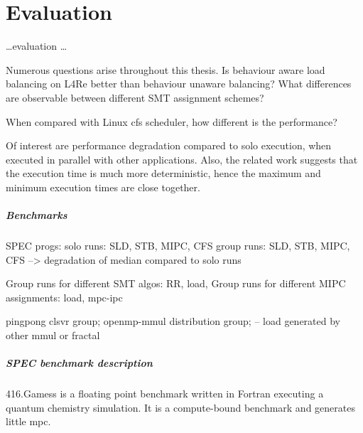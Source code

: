 \chapter{Evaluation}
\label{sec:evaluation}


\ldots evaluation \ldots

Numerous questions arise throughout this thesis.
Is behaviour aware load balancing on L4Re better than behaviour unaware
balancing?
What differences are observable between different SMT assignment schemes?

When compared with Linux \gls{cfs} scheduler, how different is the
performance?

Of interest are performance degradation compared to solo execution, when
executed in parallel with other applications.
Also, the related work suggests that the execution time is much more
deterministic, hence the maximum and minimum execution times are close
together.


\paragraph{Benchmarks}
SPEC progs:
solo runs: SLD, STB, MIPC, CFS
group runs: SLD, STB, MIPC, CFS
--> degradation of median compared  to solo runs

Group runs for different SMT algos: RR, load,
Group runs for different MIPC assignments: load, mpc-ipc

pingpong  clsvr group;
openmp-mmul distribution group; -- load generated by other mmul or fractal

\paragraph{SPEC benchmark description}
416.Gamess is a floating point benchmark written in Fortran executing a quantum
chemistry simulation.
It is a compute-bound benchmark and generates little \gls{mpc}.

